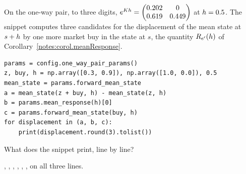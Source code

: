 \begin{question}
\label{question.oneMoreMarketBuyDisplacesTheSells}
On the one-way pair, to three digits,
$e^{K h} = \begin{pmatrix} 0.202 & 0 \\ 0.619 & 0.449 \end{pmatrix}$
at $h = 0.5$.
The snippet computes three candidates for the displacement of the mean state at $s + h$
by one more market buy in the state at $s$,
the quantity $R_{e^{\prime}}(h)$ of Corollary~\ref{notes:corol.meanResponse}.
\begin{lstlisting}[caption={Three displacements by one more market buy}, label=listing.oneMoreMarketBuyDisplacesTheSells]
params = config.one_way_pair_params()
z, buy, h = np.array([0.3, 0.9]), np.array([1.0, 0.0]), 0.5
mean_state = params.forward_mean_state
a = mean_state(z + buy, h) - mean_state(z, h)
b = params.mean_response(h)[0]
c = params.forward_mean_state(buy, h)
for displacement in (a, b, c):
    print(displacement.round(3).tolist())
\end{lstlisting}
What does the snippet print, line by line?
\begin{choices}
 \correctchoice \codehl{[0.202, 0.619]}, \codehl{[0.202, 0.0]}, \codehl{[0.302, 0.748]}
 \choice \codehl{[0.202, 0.619]}, \codehl{[0.202, 0.619]}, \codehl{[0.302, 0.748]}
 \choice \codehl{[0.202, 0.619]}, \codehl{[0.202, 0.0]}, \codehl{[0.202, 0.619]}
 \choice \codehl{[0.202, 0.619]} on all three lines.
\end{choices}
\end{question}

